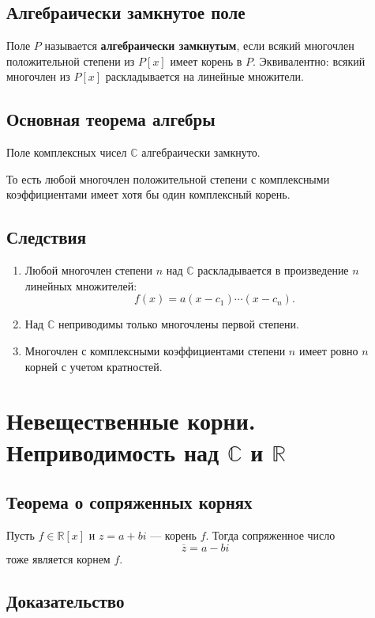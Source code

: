 \documentclass[12pt,a4paper]{article}
\newcommand{\R}{\mathbb{R}}
\renewcommand{\C}{\mathbb{C}}
\begin{document}
\subsection*{Алгебраически замкнутое поле}

Поле $P$ называется \textbf{алгебраически замкнутым}, если всякий многочлен положительной степени из $P[x]$ имеет корень в $P$. Эквивалентно: всякий многочлен из $P[x]$ раскладывается на линейные множители.

\subsection*{Основная теорема алгебры}

Поле комплексных чисел $\C$ алгебраически замкнуто.

То есть любой многочлен положительной степени с комплексными коэффициентами имеет хотя бы один комплексный корень.

\subsection*{Следствия}

\begin{enumerate}
    \item Любой многочлен степени $n$ над $\C$ раскладывается в произведение $n$ линейных множителей:
    \[
        f(x)=a(x-c_1)\cdots(x-c_n).
    \]
    \item Над $\C$ неприводимы только многочлены первой степени.
    \item Многочлен с комплексными коэффициентами степени $n$ имеет ровно $n$ корней с учетом кратностей.
\end{enumerate}

\section{Невещественные корни. Неприводимость над $\C$ и $\R$}

\subsection*{Теорема о сопряженных корнях}

Пусть $f\in\R[x]$ и $z=a+bi$ --- корень $f$. Тогда сопряженное число
\[
    \overline z=a-bi
\]
тоже является корнем $f$.

\subsection*{Доказательство}
\end{document}
